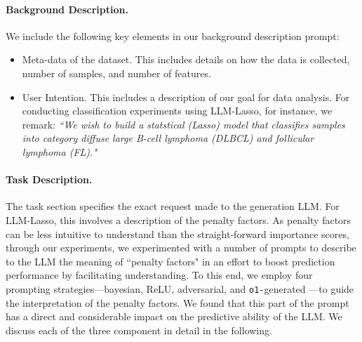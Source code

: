 \paragraph{Background Description.}
We include the following key elements in our background description prompt:
\begin{itemize}
    \item Meta-data of the dataset. This includes details on how the data is collected, number of samples, and number of features.
    \item User Intention. This includes a description of our goal for data analysis. For conducting classification experiments using LLM-Lasso, for instance, we remark: \textit{``We wish to build a statstical (Lasso) model that classifies samples into category diffuse large B-cell lymphoma (DLBCL) and follicular lymphoma (FL)."}
\end{itemize}
\paragraph{Task Description.} The task section specifies the exact request made to the generation LLM. For LLM-Lasso, this involves a description of the penalty factors. As penalty factors can be less intuitive to understand than the straight-forward importance scores,
through our experiments, we experimented with a number of prompts to describe to the LLM the meaning of ``penalty factors" in an effort to boost prediction performance by facilitating understanding. To this end, we employ four prompting strategies—bayesian, ReLU, adversarial, and \texttt{o1-}generated —to guide the interpretation of the penalty factors. We found that this part of the prompt has a direct and considerable impact on the predictive ability of the LLM. 
We discuss each of the three component in detail in the following.


